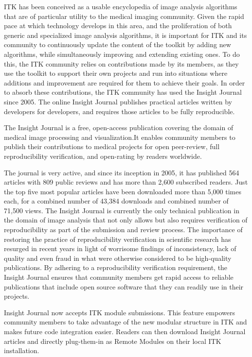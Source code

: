 \documentclass{frontiersENG} %
\begin{document}
ITK has been conceived as a usable encyclopedia of image analysis algorithms
that are of particular utility to the medical imaging community. Given the
rapid pace at which technology develops in this area, and the proliferation of
both generic and specialized image analysis algorithms, it is important for ITK
and its community to continuously update the content of the toolkit by adding
new algorithms, while simultaneously improving and extending existing ones. To
do this, the ITK community relies on contributions made by its members, as they
use the toolkit to support their own projects and run into situations where
additions and improvement are required for them to achieve their goals. In
order to absorb these contributions, the ITK community has used the Insight
Journal \cite{InsightJournal} since 2005. The online Insight Journal
publishes practical articles written by developers for developers, and requires
those articles to be fully reproducible.

The Insight Journal is a free, open-access publication covering the domain of
medical image processing and visualization.It enables community members to
publish their contributions to medical projects for open peer-review, full
reproducibility verification, and open-rating by readers worldwide.

%
%
%
The journal is very active, and since its inception in 2005, it has published
564 articles with 809 public reviews and has more than 2,600 subscribed
readers. Just the top five most popular articles have been downloaded more than
5,000 times each, for a combined number of 43,384 downloads and combined number
of 71,500 views. The Insight Journal is currently the only technical
publication in the domain of image analysis that not only allows but also
requires verification of reproducibility as part of the submission and review
process. The importance of restoring the practice of reproducibility
verification in scientific research has resurged in recent years in light of
worrisome findings of inconsistency, lack of quality and even fraud in what
were otherwise considered to be high-quality publications\cite{Begley2012}. By
adhering to a reproducibility verification requirement, the Insight Journal
ensures that community members get rapid access to reliable publications that
include open source software that they can readily use in their projects.

Insight Journal now accepts ITK module submissions. This feature empowers
community members to take advantage of the new modular structure in ITK and
makes future code integration easier. Readers can then download Insight Journal
articles and directly plug-them-in as Remote Modules on their local ITK
installation.
\end{document}
